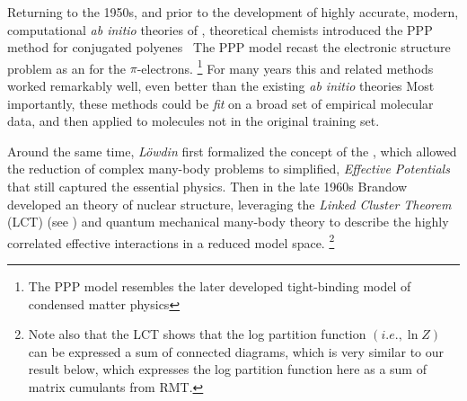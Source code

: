 Returning to the 1950s, and prior to the development of highly accurate, modern,
computational \emph{ab initio} theories of \QuantumChemistry,%
theoretical chemists introduced the \SemiEmpirical PPP method
for
conjugated polyenes~\cite{PariserParr53}%
The PPP model recast the electronic structure problem as an \emph{\EffectiveHamiltonian}
for the $\pi$-electrons.
\footnote{The PPP model resembles the later developed tight-binding model of condensed matter physics\cite{Hubbard1963}}
For many years this and related \SemiEmpirical methods
worked remarkably well, even better than the existing \emph{ab initio}
theories\cite{Dewar1975,Ridley1973,Stewart1990,Warshel1976}
Most importantly, these methods could be \emph{fit}
on a broad set of empirical molecular data, and then applied to molecules not in the original training set.

Around the same time, \emph{Löwdin} first formalized the concept of the \EffectiveHamiltonian,
which allowed the reduction of complex many-body problems to simplified,
\emph{Effective Potentials} that still captured the essential physics.
Then in the late 1960s Brandow 
developed an \EffectiveHamiltonian theory of
nuclear structure, 
leveraging the \emph{Linked Cluster Theorem} (LCT) (see \cite{Hubbard1959}) and quantum mechanical many-body theory
to describe the highly correlated effective interactions in a reduced model space.
\footnote{Note also that the LCT shows that the log partition function $(i.e., \ln Z)$ can be expressed
a sum of connected diagrams, which is very similar to our result below, which expresses the
log partition function here as a sum of matrix cumulants from RMT.}

